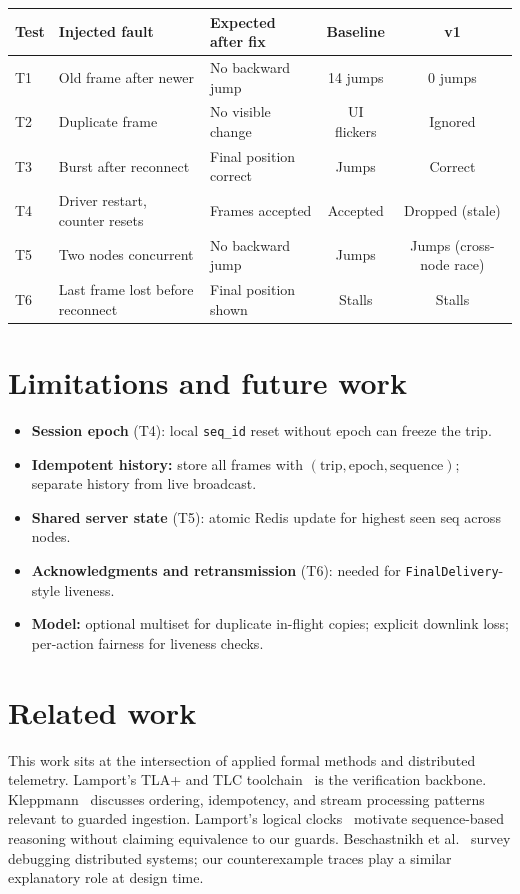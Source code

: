 \documentclass[11pt,a4paper]{article}
\begin{document}
\begin{center}
\small
\begin{tabular}{@{}lllcc@{}}
\toprule
Test & Injected fault & Expected after fix & Baseline & v1 \\
\midrule
T1 & Old frame after newer & No backward jump & 14 jumps & 0 jumps \\
T2 & Duplicate frame & No visible change & UI flickers & Ignored \\
T3 & Burst after reconnect & Final position correct & Jumps & Correct \\
T4 & Driver restart, counter resets & Frames accepted & Accepted & Dropped (stale) \\
T5 & Two nodes concurrent & No backward jump & Jumps & Jumps (cross-node race) \\
T6 & Last frame lost before reconnect & Final position shown & Stalls & Stalls \\
\bottomrule
\end{tabular}
\end{center}

\section{Limitations and future work}
\label{sec:limits}

\begin{itemize}[noitemsep]
  \item \textbf{Session epoch} (T4): local \texttt{seq\_id} reset without epoch can freeze the trip.
  \item \textbf{Idempotent history:} store all frames with \((\text{trip}, \text{epoch}, \text{sequence})\); separate history from live broadcast.
  \item \textbf{Shared server state} (T5): atomic Redis update for highest seen seq across nodes.
  \item \textbf{Acknowledgments and retransmission} (T6): needed for \texttt{FinalDelivery}-style liveness.
  \item \textbf{Model:} optional multiset for duplicate in-flight copies; explicit downlink loss; per-action fairness for liveness checks.
\end{itemize}

\section{Related work}
\label{sec:related}

This work sits at the intersection of applied formal methods and distributed telemetry. Lamport's TLA+ and TLC toolchain~\cite{lamport2002} is the verification backbone. Kleppmann~\cite{kleppmann2017} discusses ordering, idempotency, and stream processing patterns relevant to guarded ingestion. Lamport's logical clocks~\cite{lamport1978} motivate sequence-based reasoning without claiming equivalence to our guards. Beschastnikh et al.~\cite{beschastnikh2016} survey debugging distributed systems; our counterexample traces play a similar explanatory role at design time.
\end{document}
